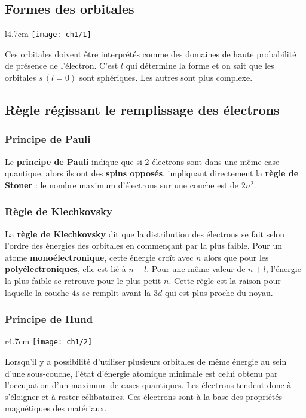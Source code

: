 \subsection{Formes des orbitales}
\begin{wrapfigure}[4]{l}{4.7cm}
	\vspace{-5mm}
	\texttt{[image: ch1/1]}
\end{wrapfigure}
Ces orbitales doivent être interprétés comme des domaines de haute probabilité de présence de l'électron. C'est $l$ qui détermine la forme et on sait que les orbitales $s\, (l=0)$ sont sphériques. Les autres sont plus complexe. \\
		
\subsection{Règle régissant le remplissage des électrons}
\subsubsection{Principe de Pauli}
Le \textbf{principe de Pauli} indique que si 2 électrons sont dans une même case quantique, alors ils ont des \textbf{spins opposés}, impliquant directement la \textbf{règle de Stoner} : le nombre maximum d'électrons sur une couche est de $2n^2$. 
	
\subsubsection{Règle de Klechkovsky}
La \textbf{règle de Klechkovsky} dit que la distribution des électrons se fait selon l'ordre des énergies des orbitales en commençant par la plus faible. Pour un atome \textbf{monoélectronique}, cette énergie croît avec $n$ alors que pour les \textbf{polyélectroniques}, elle est lié à $n+l$. Pour une même valeur de $n+l$, l'énergie la plus faible se retrouve pour le plus petit $n$. Cette règle est la raison pour laquelle la couche $4s$ se remplit avant la $3d$ qui est plus proche du noyau.\\
	
\subsubsection{Principe de Hund}
\begin{wrapfigure}[5]{r}{4.7cm}
	\vspace{-5mm}
	\texttt{[image: ch1/2]}
\end{wrapfigure}
Lorsqu'il y a possibilité d'utiliser plusieurs orbitales de même énergie au sein d'une sous-couche, l'état d'énergie atomique minimale est celui obtenu par l'occupation d'un maximum de cases quantiques. Les électrons tendent donc à s'éloigner et à rester célibataires. Ces électrons sont à la base des propriétés magnétiques des matériaux. 
	
